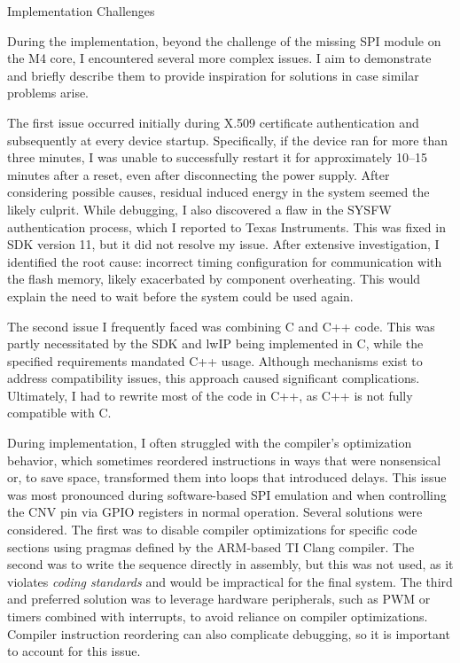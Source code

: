 \sec Implementation Challenges

During the implementation, beyond the challenge of the missing SPI module on the M4 core, I encountered several more complex issues. I aim to demonstrate and briefly describe them to provide inspiration for solutions in case similar problems arise.

The first issue occurred initially during X.509 certificate authentication and subsequently at every device startup. Specifically, if the device ran for more than three minutes, I was unable to successfully restart it for approximately 10–15 minutes after a reset, even after disconnecting the power supply. After considering possible causes, residual induced energy in the system seemed the likely culprit. While debugging, I also discovered a flaw in the SYSFW authentication process, which I reported to Texas Instruments. This was fixed in SDK version 11, but it did not resolve my issue. After extensive investigation, I identified the root cause: incorrect timing configuration for communication with the flash memory, likely exacerbated by component overheating. This would explain the need to wait before the system could be used again.

The second issue I frequently faced was combining C and C++ code. This was partly necessitated by the SDK and lwIP being implemented in C, while the specified requirements mandated C++ usage. Although mechanisms exist to address compatibility issues, this approach caused significant complications. Ultimately, I had to rewrite most of the code in C++, as C++ is not fully compatible with C.

During implementation, I often struggled with the compiler’s optimization behavior, which sometimes reordered instructions in ways that were nonsensical or, to save space, transformed them into loops that introduced delays. This issue was most pronounced during software-based SPI emulation and when controlling the CNV pin via GPIO registers in normal operation. Several solutions were considered. The first was to disable compiler optimizations for specific code sections using pragmas defined by the ARM-based TI Clang compiler. The second was to write the sequence directly in assembly, but this was not used, as it violates {\it coding standards} and would be impractical for the final system. The third and preferred solution was to leverage hardware peripherals, such as PWM or timers combined with interrupts, to avoid reliance on compiler optimizations. Compiler instruction reordering can also complicate debugging, so it is important to account for this issue.

